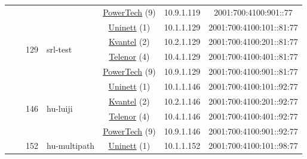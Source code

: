 \begin{small}
\begin{center}
\begin{longtable}{|c|c|c|c|c|c|c|c|}
  &  & \multicolumn{2}{|c|}{} & \multicolumn{2}{|c|}{\tiny{\href{http://www.powertech.no}{PowerTech} (9)}} & \tiny{10.9.1.119} & \tiny{2001:700:4100:901::77} \\* \cline{3-3}\cline{4-4}\cline{5-5}\cline{6-6}\cline{7-7}\cline{8-8}
  &  & \multirow{4}{*}{\tiny{129}} & \multicolumn{1}{|l|}{\multirow{4}{*}{\tiny{srl-test}}} & \multicolumn{2}{|c|}{\tiny{\href{https://www.uninett.no}{Uninett} (1)}} & \tiny{10.1.1.129} & \tiny{2001:700:4100:101::81:77} \\* \cline{5-5}\cline{6-6}\cline{7-7}\cline{8-8}
  &  &  &  & \multicolumn{2}{|c|}{\tiny{\href{http://kvantel.no}{Kvantel} (2)}} & \tiny{10.2.1.129} & \tiny{2001:700:4100:201::81:77} \\* \cline{5-5}\cline{6-6}\cline{7-7}\cline{8-8}
  &  &  &  & \multicolumn{2}{|c|}{\tiny{\href{https://www.telenor.no}{Telenor} (4)}} & \tiny{10.4.1.129} & \tiny{2001:700:4100:401::81:77} \\* \cline{5-5}\cline{6-6}\cline{7-7}\cline{8-8}
  &  &  &  & \multicolumn{2}{|c|}{\tiny{\href{http://www.powertech.no}{PowerTech} (9)}} & \tiny{10.9.1.129} & \tiny{2001:700:4100:901::81:77} \\* \cline{3-3}\cline{4-4}\cline{5-5}\cline{6-6}\cline{7-7}\cline{8-8}
  &  & \multirow{4}{*}{\tiny{146}} & \multicolumn{1}{|l|}{\multirow{4}{*}{\tiny{hu-luiji}}} & \multicolumn{2}{|c|}{\tiny{\href{https://www.uninett.no}{Uninett} (1)}} & \tiny{10.1.1.146} & \tiny{2001:700:4100:101::92:77} \\* \cline{5-5}\cline{6-6}\cline{7-7}\cline{8-8}
  &  &  &  & \multicolumn{2}{|c|}{\tiny{\href{http://kvantel.no}{Kvantel} (2)}} & \tiny{10.2.1.146} & \tiny{2001:700:4100:201::92:77} \\* \cline{5-5}\cline{6-6}\cline{7-7}\cline{8-8}
  &  &  &  & \multicolumn{2}{|c|}{\tiny{\href{https://www.telenor.no}{Telenor} (4)}} & \tiny{10.4.1.146} & \tiny{2001:700:4100:401::92:77} \\* \cline{5-5}\cline{6-6}\cline{7-7}\cline{8-8}
  &  &  &  & \multicolumn{2}{|c|}{\tiny{\href{http://www.powertech.no}{PowerTech} (9)}} & \tiny{10.9.1.146} & \tiny{2001:700:4100:901::92:77} \\* \cline{3-3}\cline{4-4}\cline{5-5}\cline{6-6}\cline{7-7}\cline{8-8}
  &  & \multirow{4}{*}{\tiny{152}} & \multicolumn{1}{|l|}{\multirow{4}{*}{\tiny{hu-multipath}}} & \multicolumn{2}{|c|}{\tiny{\href{https://www.uninett.no}{Uninett} (1)}} & \tiny{10.1.1.152} & \tiny{2001:700:4100:101::98:77} \\* \cline{5-5}\cline{6-6}\cline{7-7}\cline{8-8}

\end{longtable}
\end{center}
\end{small}

